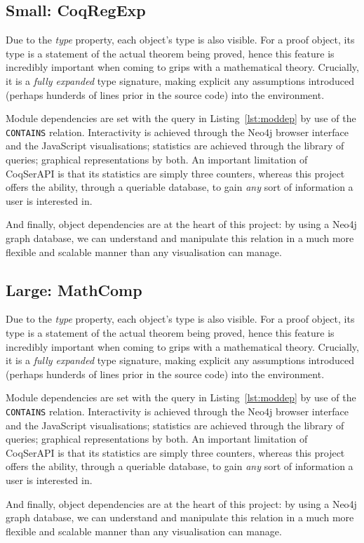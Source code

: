 \subsection{Small: CoqRegExp}

Due to the \emph{type} property, each object's type is also visible. For a proof
object, its type is a statement of the actual theorem being proved, hence this
feature is incredibly important when coming to grips with a mathematical theory.
Crucially, it is a \emph{fully expanded} type signature, making explicit any
assumptions introduced (perhaps hunderds of lines prior in the source code) into
the environment.

Module dependencies are set with the query in Listing~\ref{lst:moddep} by use of
the \texttt{CONTAINS} relation.  Interactivity is achieved through the Neo4j
browser interface and the JavaScript visualisations; statistics are achieved
through the library of queries; graphical representations by both. An important
limitation of CoqSerAPI is that its statistics are simply three counters,
whereas this project offers the ability, through a queriable database, to gain
\emph{any} sort of information a user is interested in.

And finally, object dependencies are at the heart of this project: by using a
Neo4j graph database, we can understand and manipulate this relation in a much
more flexible and scalable manner than any visualisation can manage.

\subsection{Large: MathComp}

Due to the \emph{type} property, each object's type is also visible. For a proof
object, its type is a statement of the actual theorem being proved, hence this
feature is incredibly important when coming to grips with a mathematical theory.
Crucially, it is a \emph{fully expanded} type signature, making explicit any
assumptions introduced (perhaps hunderds of lines prior in the source code) into
the environment.

Module dependencies are set with the query in Listing~\ref{lst:moddep} by use of
the \texttt{CONTAINS} relation.  Interactivity is achieved through the Neo4j
browser interface and the JavaScript visualisations; statistics are achieved
through the library of queries; graphical representations by both. An important
limitation of CoqSerAPI is that its statistics are simply three counters,
whereas this project offers the ability, through a queriable database, to gain
\emph{any} sort of information a user is interested in.

And finally, object dependencies are at the heart of this project: by using a
Neo4j graph database, we can understand and manipulate this relation in a much
more flexible and scalable manner than any visualisation can manage.
